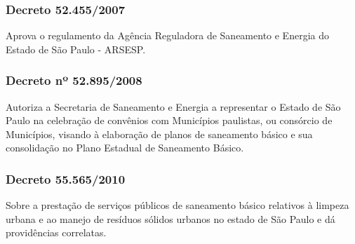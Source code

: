 \begin{subapend}
\begin{subsubapend}
		\subsubsection{Decreto 52.455/2007}
		Aprova o regulamento da Agência Reguladora de Saneamento e Energia do Estado de São Paulo - ARSESP.
		\subsubsection{Decreto nº 52.895/2008}
		Autoriza a Secretaria de Saneamento e Energia a representar o Estado de São Paulo na celebração de convênios com Municípios paulistas, ou consórcio de Municípios, visando à elaboração de planos de saneamento básico e sua consolidação no Plano Estadual de Saneamento Básico.
		\subsubsection{Decreto 55.565/2010}
		Sobre a prestação de serviços públicos de saneamento básico relativos à limpeza urbana e ao manejo de resíduos sólidos urbanos no estado de São Paulo e dá providências correlatas.
	\end{subsubapend}
\end{subapend}

